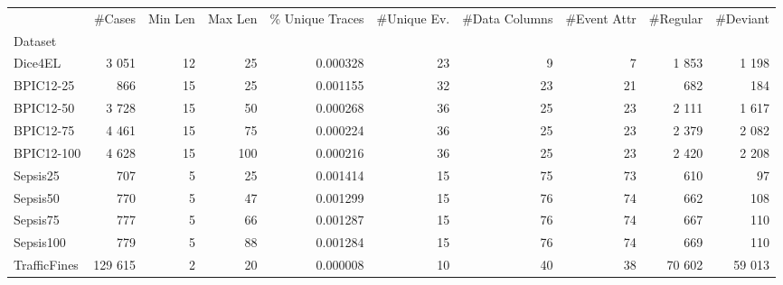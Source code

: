 \begin{tabular}{lrrrrrrrrr}
\toprule
 & \#Cases & Min Len & Max Len & \% Unique Traces & \#Unique Ev. & \#Data Columns & \#Event Attr & \#Regular & \#Deviant \\
Dataset &  &  &  &  &  &  &  &  &  \\
\midrule
Dice4EL & 3 051 & 12 & 25 & 0.000328 & 23 & 9 & 7 & 1 853 & 1 198 \\
BPIC12-25 & 866 & 15 & 25 & 0.001155 & 32 & 23 & 21 & 682 & 184 \\
BPIC12-50 & 3 728 & 15 & 50 & 0.000268 & 36 & 25 & 23 & 2 111 & 1 617 \\
BPIC12-75 & 4 461 & 15 & 75 & 0.000224 & 36 & 25 & 23 & 2 379 & 2 082 \\
BPIC12-100 & 4 628 & 15 & 100 & 0.000216 & 36 & 25 & 23 & 2 420 & 2 208 \\
Sepsis25 & 707 & 5 & 25 & 0.001414 & 15 & 75 & 73 & 610 & 97 \\
Sepsis50 & 770 & 5 & 47 & 0.001299 & 15 & 76 & 74 & 662 & 108 \\
Sepsis75 & 777 & 5 & 66 & 0.001287 & 15 & 76 & 74 & 667 & 110 \\
Sepsis100 & 779 & 5 & 88 & 0.001284 & 15 & 76 & 74 & 669 & 110 \\
TrafficFines & 129 615 & 2 & 20 & 0.000008 & 10 & 40 & 38 & 70 602 & 59 013 \\
\bottomrule
\end{tabular}
